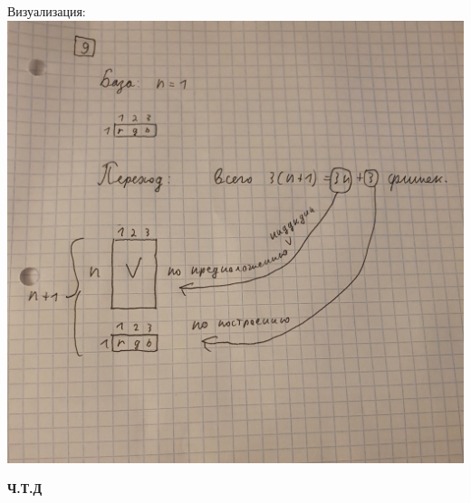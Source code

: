 \documentclass[a4paper,12pt]{article}
\begin{document}
\begin{center}
Визуализация:\\
\includegraphics[scale=0.27]{9.jpg}
\end{center}
\begin{center}
\textbf{Ч.Т.Д}
\end{center}
\end{document}
